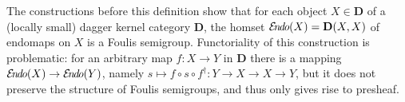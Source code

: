 \documentclass{article}
\newif\ifignore \ignorefalse
\newcommand{\auxproof}[1]{
\ifignore\mbox{}\newline
\textbf{PROOF:} \dotfill\newline
{\it #1}\mbox{}\newline
\textbf{ENDPROOF}\dotfill
\fi}
\newcommand{\after}{\mathrel{\circ}}
\newcommand{\Cat}[1]{\ensuremath{\mathbf{#1}}}
\newcommand{\ex}[2]{\exists_{#1}.\,#2}
\newcommand{\sai}[1]{[\,#1\,]}
\newcommand{\EndoHom}[1]{{\cal E}{\kern-.5ex}\textit{n}{\kern-.2ex}\textit{d}{\kern-.2ex}\textit{o}(#1)}
\begin{document}
\auxproof{
We show the equivalence of $(4)$ and $(4')$.

Assume $(4)$. Since $0\cdot 1 = 0$ we have $1 = \sai{0}\cdot y$ for
some $y\in S$. Hence $\sai{0} = \sai{0}\cdot 1 = \sai{0} \cdot \sai{0} \cdot y
= \sai{0} \cdot y = 1$. 

Next, $\sai{s} \cdot 1 = \sai{s}$, so that $\ex{y}{\sai{s} = \sai{s}\cdot y}$
and thus $s\cdot \sai{s} = 0$.

Finally, in order to prove $t = \sai{\sai{t^{\dag} \cdot s^{\dag}}\cdot
s}\cdot t$ we first note:
$$\begin{array}{rcl}
\sai{t^{\dag}\cdot s^{\dag}} \cdot s\cdot t
& = &
\big(\sai{(s\cdot t)^{\dag}} \cdot s\cdot t\big)^{\dag\dag} \\
& = &
\big((s\cdot t)^{\dag} \cdot \sai{(s\cdot t)^{\dag}}^{\dag}\big)^{\dag} \\
& = &
\big((s\cdot t)^{\dag} \cdot \sai{(s\cdot t)^{\dag}}\big)^{\dag} \\
& = &
0^{\dag} \\
& = &
0.
\end{array}$$

\noindent Hence $t = \sai{\sai{t^{\dag}\cdot s^{\dag}} \cdot s}\cdot y$,
for some $y\in S$, and thus:
$$\sai{\sai{t^{\dag}\cdot s^{\dag}} \cdot s}\cdot t
=
\sai{\sai{t^{\dag}\cdot s^{\dag}} \cdot s}\cdot 
   \sai{\sai{t^{\dag}\cdot s^{\dag}} \cdot s}\cdot y
=
\sai{\sai{t^{\dag}\cdot s^{\dag}} \cdot s}\cdot y
=
t.$$

Conversely, assume $(4)$. If $s\cdot x = 0$, then 
$$\begin{array}{rcl}
x
& = &
\sai{\sai{x^{\dag} \cdot s^{\dag}}\cdot s}\cdot x \\
&^ = &
\sai{\sai{(s\cdot x)^{\dag}}\cdot s}\cdot x \\
& = &
\sai{\sai{0^{\dag}}\cdot s}\cdot x \\
& = &
\sai{\sai{0}\cdot s}\cdot x \\
& = &
\sai{1\cdot s}\cdot x \\
& = &
\sai{s}\cdot x.
\end{array}$$

\noindent And if $x = \sai{s}\cdot y$, then $s\cdot x = s\cdot \sai{s} \cdot y
= 0\cdot y = 0$.
}



The constructions before this definition show that for each object
$X\in\Cat{D}$ of a (locally small) dagger kernel category \Cat{D}, the
homset $\EndoHom{X} = \Cat{D}(X, X)$ of endomaps on $X$ is a Foulis
semigroup. Functoriality of this construction is problematic: for an
arbitrary map $f\colon X\rightarrow Y$ in \Cat{D} there is a mapping
$\EndoHom{X} \rightarrow \EndoHom{Y}$, namely $s\mapsto f \after s
\after f^{\dag} \colon Y\rightarrow X\rightarrow X\rightarrow
Y$, but it does not preserve the structure of Foulis semigroups,
and thus only gives rise to presheaf.
\end{document}
